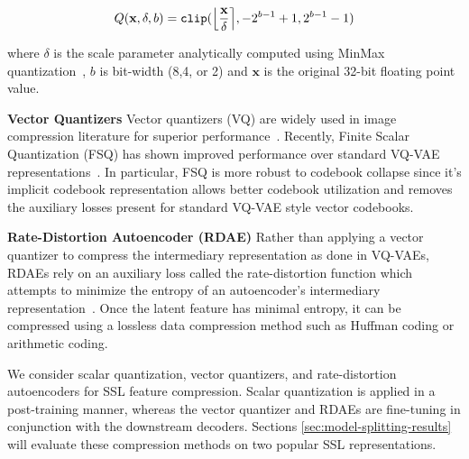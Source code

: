 \documentclass[10pt,twocolumn,letterpaper]{article}
\begin{document}
\begin{equation}
  Q(\textbf{x}, \delta, b) = \texttt{clip}(\Big{\lfloor} \frac{\textbf{x}}{\delta} \Big{\rceil}, -2^{b-1}+1, 2^{b-1}-1)
  \label{eq:quant}
\end{equation}

where $\delta$ is the scale parameter analytically computed using MinMax quantization~\cite{jacob2018quantization}, $b$ is bit-width (8,4, or 2) and $\textbf{x}$ is the original 32-bit floating point value.

\textbf{Vector Quantizers} Vector quantizers (VQ) are widely used in image compression literature for superior performance~\cite{Duan_2023, el-nouby2023image}. Recently, Finite Scalar Quantization (FSQ)  has shown improved performance over standard VQ-VAE representations~\cite{mentzer2023finite}. In particular, FSQ is more robust to codebook collapse since it's implicit codebook representation allows better codebook utilization and removes the auxiliary losses present for standard VQ-VAE style vector codebooks.

\textbf{Rate-Distortion Autoencoder (RDAE)} Rather than applying a vector quantizer to compress the intermediary representation as done in VQ-VAEs, RDAEs rely on an auxiliary loss called the rate-distortion function which attempts to minimize the entropy of an autoencoder's intermediary representation~\cite{giraldo2014ratedistortion}. Once the latent feature has minimal entropy, it can be compressed using a lossless data compression method such as Huffman coding or arithmetic coding.

We consider scalar quantization, vector quantizers, and rate-distortion autoencoders for SSL feature compression. Scalar quantization is applied in a post-training manner, whereas the vector quantizer and RDAEs are fine-tuning in conjunction with the downstream decoders. Sections \ref{sec:model-splitting-results} will evaluate these compression methods on two popular SSL representations.
\end{document}
